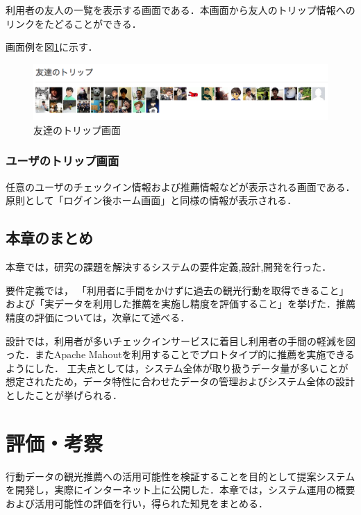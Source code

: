 \documentclass{jsarticle}
\begin{document}
利用者の友人の一覧を表示する画面である．本画面から友人のトリップ情報へのリンクをたどることができる．

画面例を図\ref{cheekitrip_friends}に示す．

\begin{figure}[!ht]
\begin{center}
\includegraphics[width=12.0cm]{./image/cheekitrip_friends.png}
\caption{友達のトリップ画面}
\label{cheekitrip_friends}
\end{center}
\end{figure}

\subsubsection{ユーザのトリップ画面}

任意のユーザのチェックイン情報および推薦情報などが表示される画面である．原則として「ログイン後ホーム画面」と同様の情報が表示される．

\subsection{本章のまとめ}

本章では，研究の課題を解決するシステムの要件定義,設計,開発を行った．

要件定義では， 「利用者に手間をかけずに過去の観光行動を取得できること」および「実データを利用した推薦を実施し精度を評価すること」を挙げた．推薦精度の評価については，次章にて述べる．

設計では，利用者が多いチェックインサービスに着目し利用者の手間の軽減を図った．またApache Mahoutを利用することでプロトタイプ的に推薦を実施できるようにした． 工夫点としては，システム全体が取り扱うデータ量が多いことが想定されたため，データ特性に合わせたデータの管理およびシステム全体の設計としたことが挙げられる．


\newpage

\section{評価・考察}

行動データの観光推薦への活用可能性を検証することを目的として提案システムを開発し，実際にインターネット上に公開した．本章では，システム運用の概要および活用可能性の評価を行い，得られた知見をまとめる．
\end{document}
